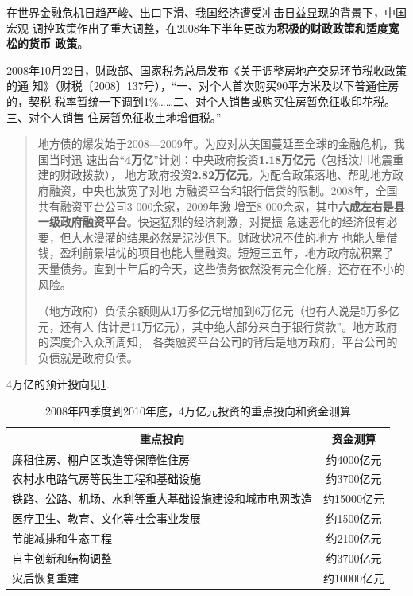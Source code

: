在世界金融危机日趋严峻、出口下滑、我国经济遭受冲击日益显现的背景下，中国宏观
调控政策作出了重大调整，在2008年下半年更改为\textbf{积极的财政政策和适度宽松的货币
  政策}。

2008年10月22日，财政部、国家税务总局发布《关于调整房地产交易环节税收政策的通
知》（财税〔2008〕137号），“一、对个人首次购买90平方米及以下普通住房的，契税
税率暂统一下调到1\%……二、对个人销售或购买住房暂免征收印花税。三、对个人销售
住房暂免征收土地增值税。”

\begin{quotation}
  地方债的爆发始于2008—2009年。为应对从美国蔓延至全球的金融危机，我国当时迅
  速出台“\textbf{4万亿}”计划：中央政府投资\textbf{1.18万亿元}（包括汶川地震重建的财政拨款），
  地方政府投资\textbf{2.82万亿元}。为配合政策落地、帮助地方政府融资，中央也放宽了对地
  方融资平台和银行信贷的限制。2008年，全国共有融资平台公司3 000余家，2009年激
  增至8 000余家，其中\textbf{六成左右是县一级政府融资平台}。快速猛烈的经济刺激，对提振
  急速恶化的经济很有必要，但大水漫灌的结果必然是泥沙俱下。财政状况不佳的地方
  也能大量借钱，盈利前景堪忧的项目也能大量融资。短短三五年，地方政府就积累了
  天量债务。直到十年后的今天，这些债务依然没有完全化解，还存在不小的风险。\cite{zhishenshinei}


  （地方政府）负债余额则从1万多亿元增加到6万亿元（也有人说是5万多亿元，还有人
  估计是11万亿元），其中绝大部分来自于银行贷款”。地方政府的深度介入众所周知，
  各类融资平台公司的背后是地方政府，平台公司的负债就是政府负债。\cite{yangdi}
\end{quotation}

4万亿的预计投向见\cref{tab:4wanyi}.

\begin{table}[]
\centering
\begin{tabular}{@{}lc@{}}
\toprule
\multicolumn{1}{c}{重点投向}    & 资金测算     \\ \midrule
廉租住房、棚户区改造等保障性住房            & 约4000亿元  \\
农村水电路气房等民生工程和基础设施           & 约3700亿元  \\
铁路、公路、机场、水利等重大基础设施建设和城市电网改造 & 约15000亿元 \\
医疗卫生、教育、文化等社会事业发展           & 约1500亿元  \\
节能减排和生态工程                   & 约2100亿元  \\
自主创新和结构调整                   & 约3700亿元  \\
灾后恢复重建                      & 约10000亿元 \\ \bottomrule
\end{tabular}
\caption{2008年四季度到2010年底，4万亿元投资的重点投向和资金测算}
\label{tab:4wanyi}
\end{table}

